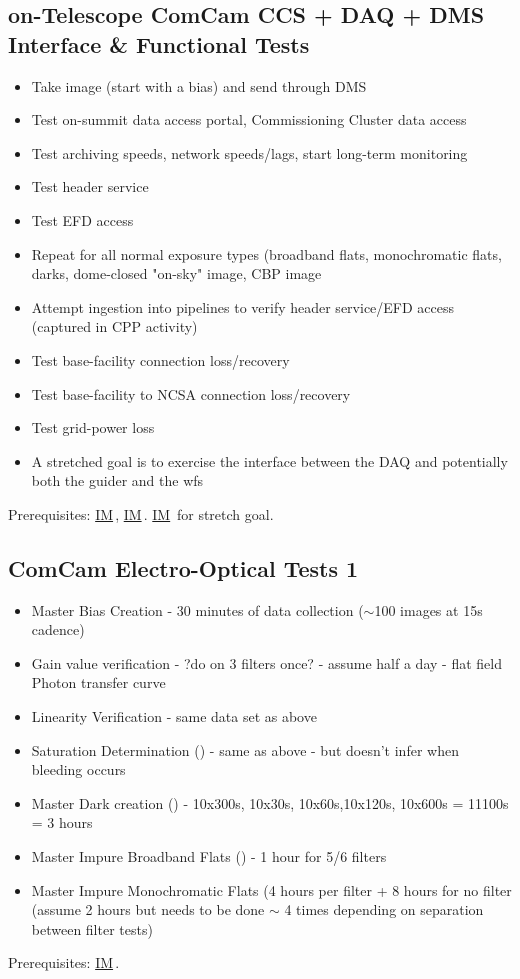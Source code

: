 \documentclass[SE,authoryear,toc]{lsstdoc}
\newcommand{\IM}[1]{\hyperref[IM:#1]{\color{blue}IM$_{\text{\csname nameIM#1\endcsname}}$}}
\begin{document}
\subsection{on-Telescope ComCam CCS + DAQ + DMS Interface \& Functional Tests}
\begin{itemize}
\item Take image (start with a bias) and send through DMS
\item Test on-summit data access portal, Commissioning Cluster data access
\item Test archiving speeds, network speeds/lags, start long-term monitoring
\item Test header service
\item Test EFD access
\item Repeat for all normal exposure types (broadband flats, monochromatic flats, darks, dome-closed "on-sky" image, CBP image
\item Attempt ingestion into pipelines to verify header service/EFD access (captured in CPP activity)
\item Test base-facility connection loss/recovery
\item Test base-facility to NCSA connection loss/recovery
\item Test grid-power loss
\item A stretched goal is to exercise the interface between the DAQ and potentially both the guider and the wfs
\end{itemize}
Prerequisites: \IM{b}, \IM{cbp}.  \IM{g} for stretch goal.

\subsection{ComCam Electro-Optical Tests 1}

\begin{itemize}
\item Master Bias Creation - 30 minutes of data collection ($\sim$100 images at 15s cadence)
\item Gain value verification - ?do on 3 filters once? - assume half a day - flat field Photon transfer curve
\item Linearity Verification - same data set as above
\item Saturation Determination () - same as above - but doesn't infer when bleeding occurs
\item Master Dark creation () - 10x300s, 10x30s, 10x60s,10x120s, 10x600s = 11100s = 3 hours
\item Master Impure Broadband Flats () - 1 hour for 5/6 filters
\item Master Impure Monochromatic Flats (4 hours per filter + 8 hours for no filter (assume 2 hours but needs to be done $\sim$ 4 times depending on separation between filter tests)
\end{itemize}
Prerequisites: \IM{b}.
\end{document}

